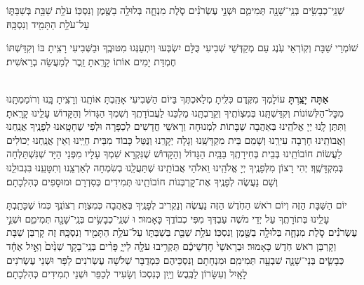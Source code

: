 \documentclass[twoside, openany, parskip=half, 11pt]{book}
\begin{document}
שְׁנֵֽי־כְבָשִׂ֥ים בְּנֵֽי־שָׁנָ֖ה תְּמִימִ֑ם וּשְׁנֵ֣י עֶשְׂרֹנִ֗ים סֹ֧לֶת מִנְחָ֛ה בְּלוּלָ֥ה בַשֶּׁ֖מֶן וְנִסְכּֽוֹ׃ עֹלַ֥ת שַׁבַּ֖ת בְּשַׁבַּתּ֑וֹ עַל־עֹלַ֥ת הַתָּמִ֖יד וְנִסְכָּֽהּ׃

שׁוֹמְרֵי שַׁבָּת וְקֽוֹרְאֵי עֹֽנֶג עַם מְקַדְּשֵׁי שְׁבִיעִי כֻּלָּם יִשְׂבְּעוּ וְיִתְעַנְּגוּ מִטּוּבֶֽךָ וּבַשְּׁבִיעִי רָצִֽיתָ בּוֹ וְקִדַּשְׁתּוֹ חֶמְדַּת יָמִים אוֹתוֹ קָרָֽאתָ זֵֽכֶר לְמַעֲשֵׂה בְרֵאשִׁית׃

\shabboskiddushhayom{} 

\begin{sometimes}

\label{shabbosroshchodesh}
\\
\textbf{אַתָּה יָצַֽרְתָּ}
עוֹלָמְךָ מִקֶּֽדֶם כִּלִּֽיתָ מְלַאכְתְּךָ בַּיוֹם הַשְּׁבִיעִי אָהַֽבְתָּ אוֹתָֽנוּ וְרָצִֽיתָ בָּֽנוּ וְרוֹמַמְתָּֽנוּ מִכׇּל־הַלְּשׁוֹנוֹת וְקִדַּשְׁתָּֽנוּ בְּמִצְוֹתֶֽיךָ וְקֵרַבְתָּֽנוּ מַלְכֵּנוּ לַעֲבוֹדָתֶֽךָ וְשִׁמְךָ הַגָּדוֹל וְהַקָּדוֹשׁ עָלֵֽינוּ קָרָֽאתָ׃ וַתִּתֶּן לָֽנוּ יְיָ אֱלֹהֵֽינוּ בְּאַהֲבָה שַׁבָּתוֹת לִמְנוּחָה וְרָאשֵׁי חֳדָשִׁים לְכַפָּרָה וּלְפִי שֶׁחָטָֽאנוּ לְפָנֶֽיךָ אֲנַֽחְנוּ וַאֲבוֹתֵֽינוּ חָרְבָה עִירֵֽנוּ וְשָׁמֵם בֵּית מִקְדָּשֵֽׁנוּ וְגָלָה יְקָרֵֽנוּ וְנֻּטַּל כָּבוֹד מִבֵּית חַיֵּֽינוּ וְאֵין אֲנַֽחְנוּ יְכוֹלִים לַעֲשׂוֹת חוֹבוֹתֵֽינוּ בְּבֵית בְּחִירָתֶֽךָ בַּבַּֽיִת הַגָּדוֹל וְהַקָּדוֹשׁ שֶׁנִּקְרָא שִׁמְךָ עָלָיו מִפְּנֵי הַיָּד שְׁנִּשְׁתַּלְּחָה בְּמִקְדָּשֶֽׁךָ׃ יְהִי רָצוֹן מִלְּפָנֶֽיךָ יְיָ אֱלֹהֵֽינוּ וֵאלֹהֵי אֲבוֹתֵֽינוּ שֶׁתַּעֲלֵֽנוּ בְשִׂמְחָה לְאַרְצֵֽנוּ וְתִטָּעֵֽנוּ בִּגְבוּלֵֽנוּ וְשָׁם נַעֲשֶׂה לְפָנֶֽיךָ אֶת־קׇרְבְּנוֹת חוֹבוֹתֵֽינוּ תְּמִידִים כְּסִדְרָם וּמוּסָפִים כְּהִלְכָתָם׃

יוֹם הַשַּׁבָּת הַזֶּה וְיוֹם רֹאשׁ הַחֹֽדֶשׁ הַזֶּה נַעֲשֶׂה וְנַקְרִיב לְפָנֶֽיךָ בְּאַהֲבָה כְּמִצְוַת רְצוֹנֶֽךָ כְּמוֹ שֶׁכָּתַֽבְתָּ עָלֵֽינוּ בְּתוֹרָתֶֽךָ עַל יְדֵי מֹשֶׁה עַבְדְּךָ מִפִּי כְבוֹדֶֽךָ כָּאָמוּר׃ וּ
שְׁנֵֽי־כְבָשִׂ֥ים בְּנֵֽי־שָׁנָ֖ה תְּמִימִ֑ם וּשְׁנֵ֣י עֶשְׂרֹנִ֗ים סֹ֧לֶת מִנְחָ֛ה בְּלוּלָ֥ה בַשֶּׁ֖מֶן וְנִסְכּֽוֹ׃ עֹלַ֥ת שַׁבַּ֖ת בְּשַׁבַּתּ֑וֹ עַל־עֹלַ֥ת הַתָּמִ֖יד וְנִסְכָּֽהּ׃ זֶה קָרְבַּן שַׁבָּת וְקָרְבַּן רֹאשׁ חֹֽדֶשׁ כָּאָמוּר׃ וּבְרָאשֵׁי֙  חׇדְשֵׁיכֶ֔ם תַּקְרִ֥יבוּ עֹלָ֖ה לַייָ֑ פָּרִ֨ים בְּנֵֽי־בָקָ֤ר שְׁנַ֙יִם֙ וְאַ֣יִל אֶחָ֔ד כְּבָשִׂ֧ים בְּנֵי־שָׁנָ֛ה שִׁבְעָ֖ה תְּמִימִֽם׃ וּמִנְחָתָם וְנִסְכֵּיהֶם כִּמְדֻבָּר שְׁלֹשָׁה עֶשְׂרֹנִים לַפָּר וּשְׁנֵי עֶשְׂרֹנִים לָאָֽיִל וְעִשָּׂרוֹן לַכֶּֽבֶשׂ וְיַֽיִן כְּנִסְכּוֹ וְשָׂעִיר לְכַפֵּר וּשְׁנֵי תְמִידִים כְּהִלְכָתָם׃


\end{sometimes}
\end{document}
